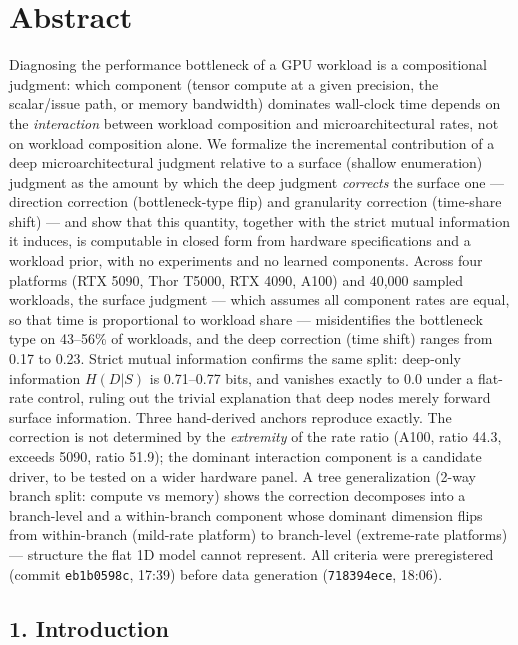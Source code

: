 \section*{Abstract}\label{abstract}

Diagnosing the performance bottleneck of a GPU workload is a compositional judgment: which component (tensor compute at a given precision, the scalar/issue path, or memory bandwidth) dominates wall-clock time depends on the \emph{interaction} between workload composition and microarchitectural rates, not on workload composition alone. We formalize the incremental contribution of a deep microarchitectural judgment relative to a surface (shallow enumeration) judgment as the amount by which the deep judgment \emph{corrects} the surface one --- direction correction (bottleneck-type flip) and granularity correction (time-share shift) --- and show that this quantity, together with the strict mutual information it induces, is computable in closed form from hardware specifications and a workload prior, with no experiments and no learned components. Across four platforms (RTX 5090, Thor T5000, RTX 4090, A100) and 40,000 sampled workloads, the surface judgment --- which assumes all component rates are equal, so that time is proportional to workload share --- misidentifies the bottleneck type on 43--56\% of workloads, and the deep correction (time shift) ranges from 0.17 to 0.23. Strict mutual information confirms the same split: deep-only information \(H(D|S)\) is 0.71--0.77 bits, and vanishes exactly to 0.0 under a flat-rate control, ruling out the trivial explanation that deep nodes merely forward surface information. Three hand-derived anchors reproduce exactly. The correction is not determined by the \emph{extremity} of the rate ratio (A100, ratio 44.3, exceeds 5090, ratio 51.9); the dominant interaction component is a candidate driver, to be tested on a wider hardware panel. A tree generalization (2-way branch split: compute vs memory) shows the correction decomposes into a branch-level and a within-branch component whose dominant dimension flips from within-branch (mild-rate platform) to branch-level (extreme-rate platforms) --- structure the flat 1D model cannot represent. All criteria were preregistered (commit \texttt{eb1b0598c}, 17:39) before data generation (\texttt{718394ece}, 18:06).

\subsection{1. Introduction}\label{introduction}


